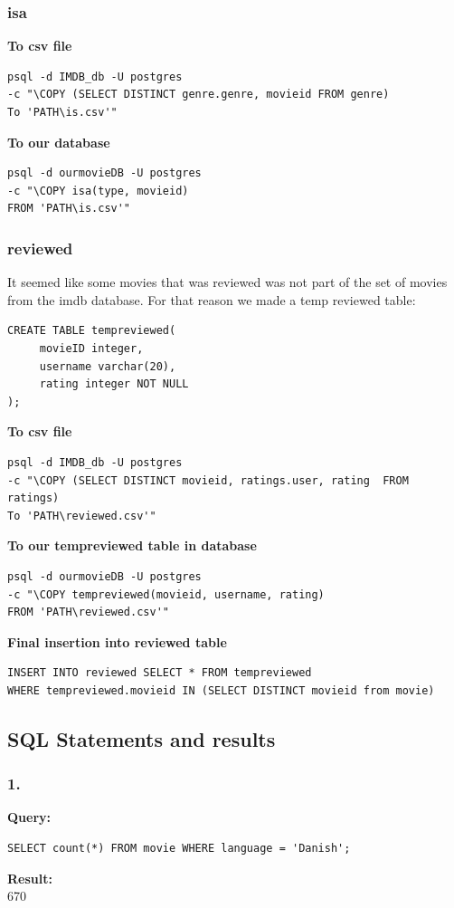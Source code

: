 \documentclass[10pt,a4paper,final]{report}
\begin{document}
\subsubsection*{isa}
\textbf{To csv file}
\begin{lstlisting}
psql -d IMDB_db -U postgres 
-c "\COPY (SELECT DISTINCT genre.genre, movieid FROM genre) 
To 'PATH\is.csv'"
\end{lstlisting}
\textbf{To our database}
\begin{lstlisting}
psql -d ourmovieDB -U postgres 
-c "\COPY isa(type, movieid) 
FROM 'PATH\is.csv'"
\end{lstlisting}

\subsubsection*{reviewed}
It seemed like some movies that was reviewed was not part of the set of movies from the imdb database. For that reason we made a temp reviewed table:
\begin{lstlisting}
CREATE TABLE tempreviewed(
     movieID integer,
     username varchar(20),
     rating integer NOT NULL
);
\end{lstlisting}
\textbf{To csv file}
\begin{lstlisting}
psql -d IMDB_db -U postgres 
-c "\COPY (SELECT DISTINCT movieid, ratings.user, rating  FROM ratings) 
To 'PATH\reviewed.csv'"
\end{lstlisting}
\textbf{To our tempreviewed table in database}
\begin{lstlisting}
psql -d ourmovieDB -U postgres 
-c "\COPY tempreviewed(movieid, username, rating) 
FROM 'PATH\reviewed.csv'"
\end{lstlisting}
\textbf{Final insertion into reviewed table}
\begin{lstlisting}
INSERT INTO reviewed SELECT * FROM tempreviewed 
WHERE tempreviewed.movieid IN (SELECT DISTINCT movieid from movie)
\end{lstlisting}
\subsection*{SQL Statements and results}

\subsubsection*{1.}
\textbf{Query:}
\begin{lstlisting}
SELECT count(*) FROM movie WHERE language = 'Danish';
\end{lstlisting}
\textbf{Result:}\\
670
\end{document}
